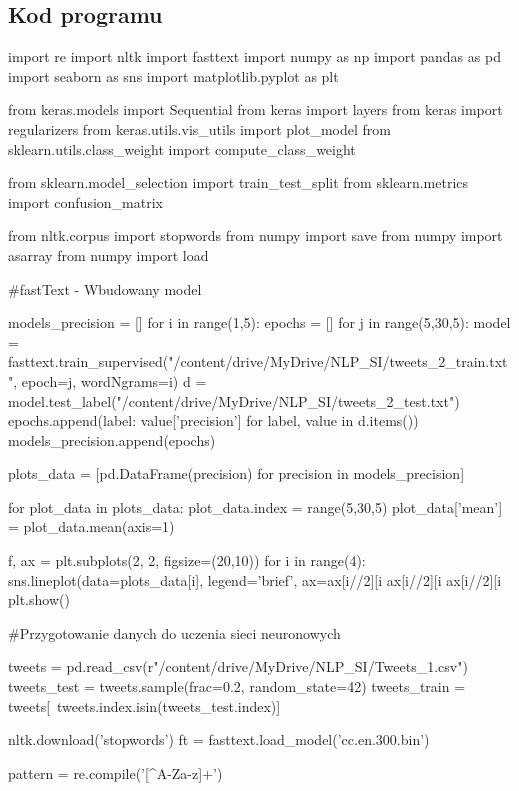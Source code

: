 \documentclass[11pt, a4paper, notitlepage]{report}
\begin{document}
\begin{appendices}
\chapter{Kod programu}
\begin{spverbatim}
import re
import nltk
import fasttext
import numpy as np
import pandas as pd
import seaborn as sns
import matplotlib.pyplot as plt

from keras.models import Sequential
from keras import layers
from keras import regularizers
from keras.utils.vis_utils import plot_model
from sklearn.utils.class_weight import compute_class_weight

from sklearn.model_selection import train_test_split
from sklearn.metrics import confusion_matrix

from nltk.corpus import stopwords
from numpy import save
from numpy import asarray
from numpy import load

#fastText - Wbudowany model

models_precision = []
for i in range(1,5):
    epochs = []
    for j in range(5,30,5):
        model = fasttext.train_supervised("/content/drive/MyDrive/NLP_SI/tweets_2_train.txt", epoch=j, wordNgrams=i)
        d = model.test_label("/content/drive/MyDrive/NLP_SI/tweets_2_test.txt")
        epochs.append({label: value['precision'] for label, value in d.items()})
    models_precision.append(epochs)

plots_data = [pd.DataFrame(precision) for precision in models_precision]

for plot_data in plots_data:
    plot_data.index = range(5,30,5)
    plot_data['mean'] = plot_data.mean(axis=1)

f, ax = plt.subplots(2, 2, figsize=(20,10))
for i in range(4):
    sns.lineplot(data=plots_data[i], legend='brief', ax=ax[i//2][i%
    ax[i//2][i%
    ax[i//2][i%
plt.show()

#Przygotowanie danych do uczenia sieci neuronowych

tweets = pd.read_csv(r"/content/drive/MyDrive/NLP_SI/Tweets_1.csv")
tweets_test = tweets.sample(frac=0.2, random_state=42)
tweets_train = tweets[~tweets.index.isin(tweets_test.index)]

nltk.download('stopwords')
ft = fasttext.load_model('cc.en.300.bin')

pattern = re.compile('[^A-Za-z]+')


\end{spverbatim}
\end{appendices}
\end{document}
